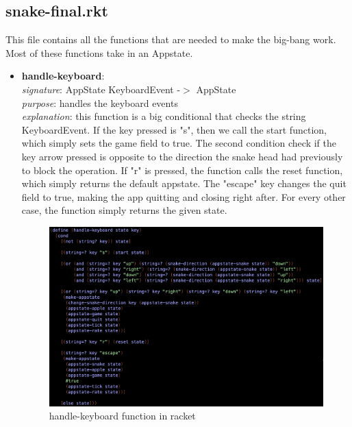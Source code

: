 \documentclass{article}
\begin{document}
	\subsection{snake-final.rkt}
	This file contains all the functions that are needed to make the big-bang work. Most of these functions take in an Appstate.
	\begin{itemize}
		\item \textbf{handle-keyboard}: \\
			\emph{signature}: AppState KeyboardEvent -$>$ AppState \\
			\emph{purpose}: handles the keyboard events \\
			\emph{explanation}: this function is a big conditional that checks the string KeyboardEvent. If the key pressed is "s", then we call the start function, which simply sets the game field to true. The second condition check if the key arrow pressed is opposite to the direction the snake head had previously to block the operation. If "r" is pressed, the function calls the reset function, which simply returns the default appstate. The "escape" key changes the quit field to true, making the app quitting and closing right after. For every other case, the function simply returns the given state.
			\begin{figure}[h!]
				\centering
				\includegraphics[width=.6\linewidth]{handle-keyboard.png}
				\caption{handle-keyboard function in racket}
			\end{figure}
			

\end{itemize}
\end{document}
